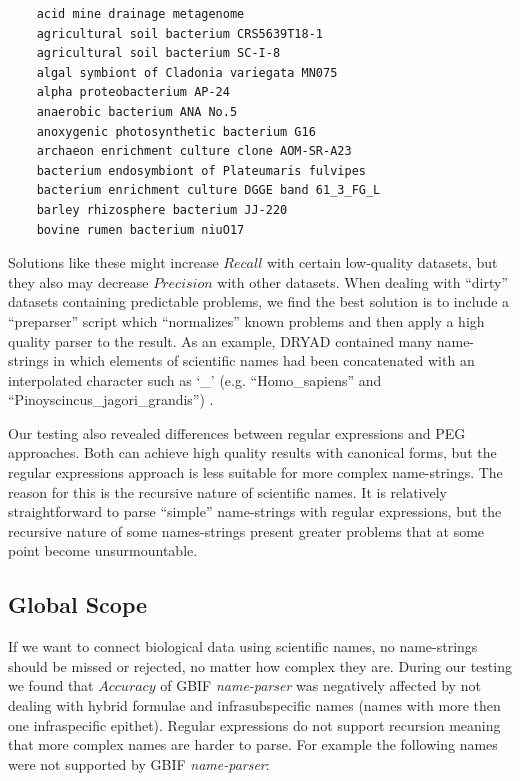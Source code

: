 \documentclass{bmcart}
\begin{document}
\vspace{0.5cm}

\begin{verbatim}
    acid mine drainage metagenome
    agricultural soil bacterium CRS5639T18-1
    agricultural soil bacterium SC-I-8
    algal symbiont of Cladonia variegata MN075
    alpha proteobacterium AP-24
    anaerobic bacterium ANA No.5
    anoxygenic photosynthetic bacterium G16
    archaeon enrichment culture clone AOM-SR-A23
    bacterium endosymbiont of Plateumaris fulvipes
    bacterium enrichment culture DGGE band 61_3_FG_L
    barley rhizosphere bacterium JJ-220
    bovine rumen bacterium niuO17
\end{verbatim}

\vspace{0.5cm}

Solutions like these might increase $Recall$ with certain low-quality datasets,
but they also may decrease $Precision$ with other datasets. When dealing with
``dirty'' datasets containing predictable problems, we find the best solution is
to include a ``preparser'' script which ``normalizes'' known problems  and then
apply a high quality parser to the result.  As an example, DRYAD contained many name-strings in which elements of
scientific names had been concatenated with an interpolated character such
as `\_’ (e.g. ``Homo\_sapiens'' and ``Pinoyscincus\_jagori\_grandis'')
\cite{Patterson:inpress-a}.

Our testing also revealed differences between regular expressions and PEG
approaches. Both can achieve high quality results with canonical forms, but the
regular expressions approach is less suitable for more complex name-strings.
The reason for this is the recursive nature of scientific names.  It is
relatively straightforward to parse ``simple'' name-strings with regular
expressions, but the recursive nature of some names-strings present greater
problems that at some point become unsurmountable.

\subsection*{Global Scope}

If we want to connect biological data using scientific names, no name-strings
should be missed or rejected, no matter how complex they are. During our
testing we found that $Accuracy$ of GBIF \textit{name-parser} was negatively
affected by not dealing with hybrid formulae and infrasubspecific names (names
with more then one infraspecific epithet). Regular expressions do not support
recursion meaning that more complex names are harder to parse.  For example the
following names were not supported by GBIF \textit{name-parser}:
\end{document}
